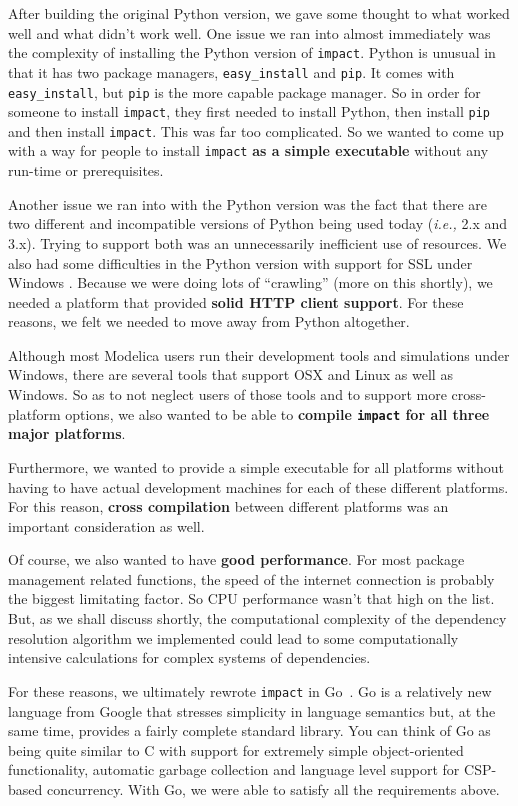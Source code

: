 \documentclass[11pt,a4paper,twocolumn]{article}
\newcommand{\code}[1]{\texttt{#1}} %
\begin{document}
After building the original Python version, we gave some thought to
what worked well and what didn't work well.  One issue we ran into
almost immediately was the complexity of installing the Python version
of \code{impact}.  Python is unusual in that it has two package
managers, \code{easy\_install} and \code{pip}.  It comes with
\code{easy\_install}, but \code{pip} is the more capable package
manager.  So in order for someone to install \code{impact}, they first
needed to install Python, then install \code{pip} and then install
\code{impact}.  This was far too complicated.  So we wanted to come up
with a way for people to install \code{impact} \textbf{as a simple
  executable} without any run-time or prerequisites.

Another issue we ran into with the Python version was the fact that
there are two different and incompatible versions of Python being used
today ({\it i.e.,} 2.x and 3.x).  Trying to support both was an
unnecessarily inefficient use of resources.  We also had some
difficulties in the Python version with support for SSL under Windows
\parencite{python-ssl}.  Because we were doing lots of ``crawling''
(more on this shortly), we needed a platform that provided
\textbf{solid HTTP client support}.  For these reasons, we felt we
needed to move away from Python altogether.

Although most Modelica users run their development tools and
simulations under Windows, there are several tools that support OSX
and Linux as well as Windows.  So as to not neglect users of those
tools and to support more cross-platform options, we also wanted to be
able to \textbf{compile \code{impact} for all three major platforms}.

Furthermore, we wanted to provide a simple executable for all
platforms without having to have actual development machines for each
of these different platforms.  For this reason, \textbf{cross
  compilation} between different platforms was an important
consideration as well.

Of course, we also wanted to have \textbf{good performance}.  For most
package management related functions, the speed of the internet
connection is probably the biggest limitating factor.  So CPU
performance wasn't that high on the list.  But, as we shall discuss
shortly, the computational complexity of the dependency resolution
algorithm we implemented could lead to some computationally intensive
calculations for complex systems of dependencies.

For these reasons, we ultimately rewrote \code{impact} in
Go~\parencite{go-lang}.  Go is a relatively new language from Google
that stresses simplicity in language semantics but, at the same time,
provides a fairly complete standard library.  You can think of Go as
being quite similar to C with support for extremely simple
object-oriented functionality, automatic garbage collection and
language level support for CSP-based concurrency.  With Go, we were
able to satisfy all the requirements above.
\end{document}
